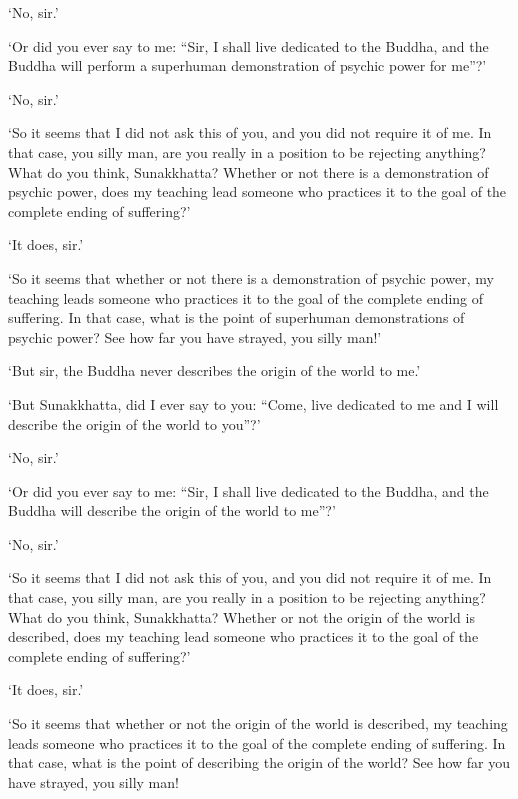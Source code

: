 \documentclass[12pt,openany]{book}%
\begin{document}
‘No, sir.’ 

‘Or did you ever say to me: “Sir, I shall live dedicated to the Buddha, and the Buddha will perform a superhuman demonstration of psychic power for me”?’ 

‘No, sir.’ 

‘So it seems that I did not ask this of you, and you did not require it of me. In that case, you silly man, are you really in a position to be rejecting anything? What do you think, Sunakkhatta? Whether or not there is a demonstration of psychic power, does my teaching lead someone who practices it to the goal of the complete ending of suffering?’ 

‘It does, sir.’ 

‘So it seems that whether or not there is a demonstration of psychic power, my teaching leads someone who practices it to the goal of the complete ending of suffering. In that case, what is the point of superhuman demonstrations of psychic power? See how far you have strayed, you silly man!’ 

‘But sir, the Buddha never describes the origin of the world to me.’ 

‘But Sunakkhatta, did I ever say to you: “Come, live dedicated to me and I will describe the origin of the world to you”?’ 

‘No, sir.’ 

‘Or did you ever say to me: “Sir, I shall live dedicated to the Buddha, and the Buddha will describe the origin of the world to me”?’ 

‘No, sir.’ 

‘So it seems that I did not ask this of you, and you did not require it of me. In that case, you silly man, are you really in a position to be rejecting anything? What do you think, Sunakkhatta? Whether or not the origin of the world is described, does my teaching lead someone who practices it to the goal of the complete ending of suffering?’ 

‘It does, sir.’ 

‘So it seems that whether or not the origin of the world is described, my teaching leads someone who practices it to the goal of the complete ending of suffering. In that case, what is the point of describing the origin of the world? See how far you have strayed, you silly man! 
\end{document}
